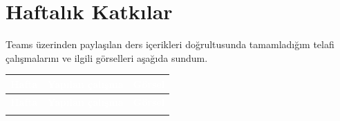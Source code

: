 \documentclass[12pt,a4paper]{article}
\begin{document}
\section{Haftalık Katkılar}
Teams üzerinden paylaşılan ders içerikleri doğrultusunda tamamladığım telafi çalışmalarını ve ilgili görselleri aşağıda sundum.

\begin{longtable}{@{}>{\raggedright\arraybackslash}p{1.7cm}%
                    >{\raggedright\arraybackslash}p{6.4cm}%
                    >{\centering\arraybackslash}p{6cm}@{}}
\toprule
\rowcolor{ana}\textcolor{white}{\textbf{Hafta}} & \textcolor{white}{\textbf{Yapılan çalışma}} & \textcolor{white}{\textbf{Görsel}} \\
\midrule
\endfirsthead
\toprule
\rowcolor{ana}\textcolor{white}{\textbf{Hafta}} & \textcolor{white}{\textbf{Yapılan çalışma}} & \textcolor{white}{\textbf{Görsel}} \\
\midrule
\endhead
\bottomrule
\endfoot


\end{longtable}
\end{document}

